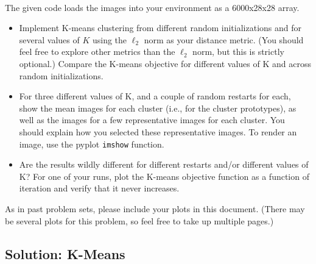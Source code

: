 \documentclass[submit]{harvardml}
\begin{document}
~

\begin{problem}
The given code loads the images into your environment as a 6000x28x28 array.

\begin{itemize}
\item Implement K-means clustering
from different random initializations 
and for several values of $K$ using the 
$\ell_2$ norm as your
distance metric. (You should feel free to explore other metrics 
than the $\ell_2$ norm, but this is strictly optional.)  Compare the 
K-means objective for different values of K and across random
initializations.
%
\item For three different values of K,
and a couple of random restarts for each, 
show the mean images for each cluster (i.e., for
the cluster prototypes), as well as the images for a 
few representative images for each cluster. You should explain how you selected
these representative images. To render an image, use the pyplot \texttt{imshow} function. 

\item Are the results wildly different for different
restarts and/or different 
values of K?
For one of your runs, plot the K-means objective function as a function of iteration and verify that
it never increases.


\end{itemize}


As in past problem sets, please include your plots in this
document. (There may be several plots for this problem, so feel free
to take up multiple pages.)




\end{problem}
\subsection*{Solution: K-Means}
\end{document}
